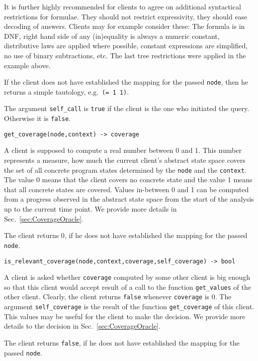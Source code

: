 \documentclass[envcountsame]{llncs}
\begin{document}
It is further highly recommended for clients to agree on additional syntactical
restrictions for formulae. They should not restrict expressivity, they should
ease decoding of answers. Clients may for example consider these: The formula is
in DNF, right hand side of any (in)equality is always a numeric constant,
distributive laws are applied where possible, constant expressions are
simplified, no use of binary subtractions, etc. The last tree restrictions were
applied in the example above.

If the client does not have established the mapping for the passed
\texttt{node}, then he returns a simple tautology, e.g.~\texttt{(= 1 1)}.

The argument \texttt{self\_call} is \texttt{true} if the client is the one who
initiated the query. Otherwise it is \texttt{false}. \newline

\noindent\texttt{get\_coverage(node,context) -> coverage}

A client is supposed to compute a real number between 0 and 1. This number
represents a measure, how much the current client's abstract state space covers
the set of all concrete program states determined by the \texttt{node} and the
\texttt{context}. The value 0 means that the client covers no concrete state and
the value 1 means that all concrete states are covered. Values in-between 0 and
1 can be computed from a progress observed in the abstract state space from
the start of the analysis up to the current time point. We provide more details
in Sec.~\ref{sec:CoverageOracle}.

The client returns 0, if he does not have established the mapping for the passed
\texttt{node}. \newline


\noindent\texttt{is\_relevant\_coverage(node,context,coverage,self\_coverage) -> bool}

A client is asked whether \texttt{coverage} computed by some other client is big
enough so that this client would accept result of a call to the function
\texttt{get\_values} of the other client. Clearly, the client returns
\texttt{false} whenever \texttt{coverage} is 0. The argument
\texttt{self\_coverage} is the result of the function \texttt{get\_coverage} of
this client. This values may be useful for the client to make the decision. We
provide more details to the decision in Sec.~\ref{sec:CoverageOracle}.

The client returns \texttt{false}, if he does not have established the mapping
for the passed \texttt{node}.
\newline
\end{document}

